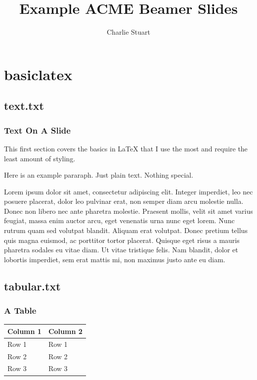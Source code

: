 \documentclass[10pt]{beamer}
\title[example]{Example ACME Beamer Slides}
\date{}
\author{Charlie Stuart }
\begin{document}
\begin{frame}[plain]
\titlepage
\end{frame}

\section{basiclatex}
\subsection{text.txt}
\begin{frame}
	\frametitle{Text On A Slide}

	This first section covers the basics in LaTeX that I use the most and
	require the least amount of styling.

	Here is an example pararaph.
	Just plain text.
	Nothing special.

	Lorem ipsum dolor sit amet, consectetur adipiscing elit.
	Integer imperdiet, leo nec posuere placerat, dolor leo pulvinar erat, non
	semper diam arcu molestie nulla.
	Donec non libero nec ante pharetra molestie.
	Praesent mollis, velit sit amet varius feugiat, massa enim auctor arcu,
	eget venenatis urna nunc eget lorem. Nunc rutrum quam sed volutpat blandit.
	Aliquam erat volutpat. Donec pretium tellus quis magna euismod, ac porttitor
	tortor placerat.
	Quisque eget risus a mauris pharetra sodales eu vitae diam.
	Ut vitae tristique felis.
	Nam blandit, dolor et lobortis imperdiet, sem erat mattis mi, non maximus
	justo ante eu diam.
\end{frame}

\subsection{tabular.txt}
\begin{frame}
	\frametitle{A Table}

	\begin{tabular}{| l l |}
	\hline
	\textbf{Column 1} & \textbf{Column 2} \\
	\hline
	Row 1 & Row 1 \\
	Row 2 & Row 2 \\
	Row 3 & Row 3 \\
	\hline
	\end{tabular}
\end{frame}
\end{document}
